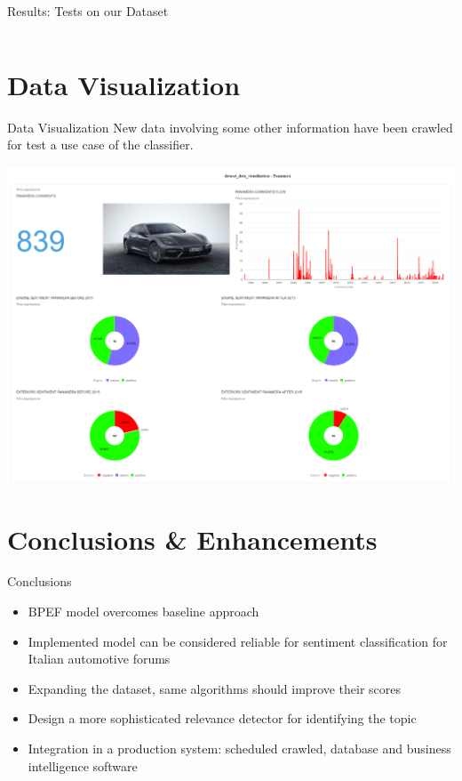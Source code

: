 \documentclass{beamer}
\begin{document}
\begin{frame}{Results: Tests on our Dataset}
{\begin{columns}
				
			\end{columns}
			
		}
		
	\end{frame}







	
	\section{Data Visualization}
	
	\begin{frame}{Data Visualization}
		\centering
		New data involving some other information have been crawled for test a use case of the classifier.

		\includegraphics[width=0.8\linewidth]{figures/dataset_data_visualization_2.pdf}

	\end{frame}









	\section{Conclusions \& Enhancements}
	
	\begin{frame}{Conclusions}
		
		\begin{itemize}
			\item BPEF model overcomes baseline approach
			\item Implemented model can be considered reliable for sentiment classification for Italian automotive forums
			\item Expanding the dataset, same algorithms should improve their scores
			\item Design a more sophisticated relevance detector for identifying the topic
			\item Integration in a production system: scheduled crawled, database and business intelligence software
		\end{itemize}

	\end{frame}
\end{document}

